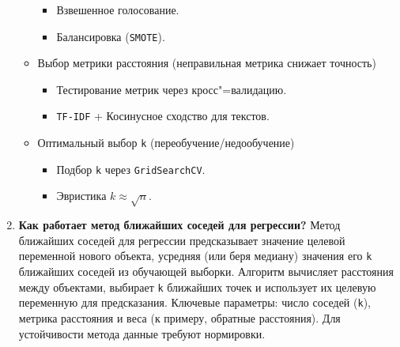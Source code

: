 \documentclass{article}
\begin{document}
\begin{enumerate}
\begin{itemize}
\begin{itemize}
                    \item Взвешенное голосование.
                    \item Балансировка (\texttt{SMOTE}).
                \end{itemize}
            \item Выбор метрики расстояния (неправильная метрика снижает точность)
                \begin{itemize}
                    \item Тестирование метрик через кросс"=валидацию.
                    \item \texttt{TF-IDF} + Косинусное сходство для текстов.
                \end{itemize}
            \item Оптимальный выбор \texttt{k} (переобучение/недообучение)
                \begin{itemize}
                    \item Подбор \texttt{k} через \texttt{GridSearchCV}.
                    \item Эвристика \( k \approx \sqrt{n} \).
                \end{itemize}
        \end{itemize}
    \item \textbf{Как работает метод ближайших соседей для регрессии?}
        Метод ближайших соседей для регрессии предсказывает значение целевой переменной нового объекта, усредняя (или беря медиану) значения его \texttt{k} ближайших соседей из обучающей выборки. Алгоритм вычисляет расстояния между объектами, выбирает \texttt{k} ближайших точек и использует их целевую переменную для предсказания. Ключевые параметры: число соседей (\texttt{k}), метрика расстояния и веса (к примеру, обратные расстояния). Для устойчивости метода данные требуют нормировки.
\end{enumerate}
\end{document}
